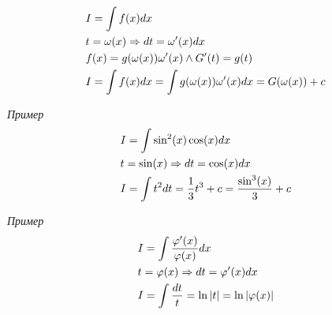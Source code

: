 \documentclass{article}
\begin{document}
\pagebreak

\begin{align*}
	 & I=\int f(x)dx                                              \\
	 & t=\omega(x)\Rightarrow dt=\omega'(x)dx                           \\
	 & f(x)=g(\omega(x))\omega'(x)\land G'(t)=g(t)                \\
	 & I=\int f(x)dx=\int g(\omega(x))\omega'(x)dx=G(\omega(x))+c
\end{align*}

{\it Пример}
\begin{align*}
	 & I=\int\sin^{2}(x)\cos(x)dx                                \\
	 & t=\sin(x)\Rightarrow dt=\cos(x)dx                               \\
	 & I=\int t^{2}dt=\frac{1}{3}t^{3}+c=\frac{\sin^{3}(x)}{3}+c
\end{align*}

{\it Пример}
\begin{align*}
	 & I =\int\frac{\varphi'(x)}{\varphi(x)}dx    \\
	 & t=\varphi(x)\Rightarrow dt=\varphi'(x)dx         \\
	 & I=\int \frac{dt}{t}=\ln|t|=\ln|\varphi(x)|
\end{align*}
\end{document}
